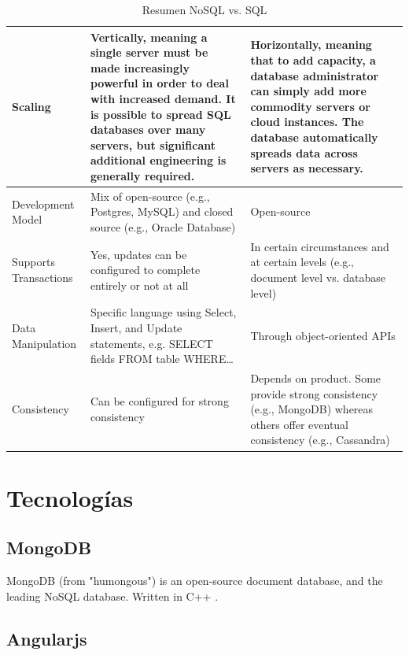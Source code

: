 \begin{table}[h!]
\begin{tabular}{ |L{0.1\paperwidth}|L{0.3\paperwidth}|L{0.3\paperwidth}|}
\\ \hline
	Scaling&
	Vertically, meaning a single server must be made increasingly powerful in order to deal with increased demand. It is possible to spread SQL databases over many servers, but significant additional engineering is generally required.&
	Horizontally, meaning that to add capacity, a database administrator can simply add more commodity servers or cloud instances. The database automatically spreads data across servers as necessary.
	
\\ \hline
	Development Model&
	Mix of open-source (e.g., Postgres, MySQL) and closed source (e.g., Oracle Database)&
	Open-source
	
\\ \hline
	Supports Transactions&
	Yes, updates can be configured to complete entirely or not at all&
	In certain circumstances and at certain levels (e.g., document level vs. database level)
	
\\ \hline
	Data Manipulation&
	Specific language using Select, Insert, and Update statements, e.g. SELECT fields FROM table WHERE…&
	Through object-oriented APIs

\\ \hline
	Consistency&
	Can be configured for strong consistency&
	Depends on product. Some provide strong consistency (e.g., MongoDB) whereas others offer eventual consistency (e.g., Cassandra)

\\ \hline
\end{tabular}
    \caption{ Resumen NoSQL vs. SQL}
    \label{tab:SQL_vs_noSQL_summary}
\end{table}

\section{Tecnologías }\label{cap:estadoArte:tecnologias}

	\subsection{MongoDB}
	MongoDB (from "humongous") is an open-source document database, and the leading NoSQL database. Written in C++ \cite{technology_mongodb}.
	
	\subsection{Angularjs}
	\cite{technology_angularjs}
	
